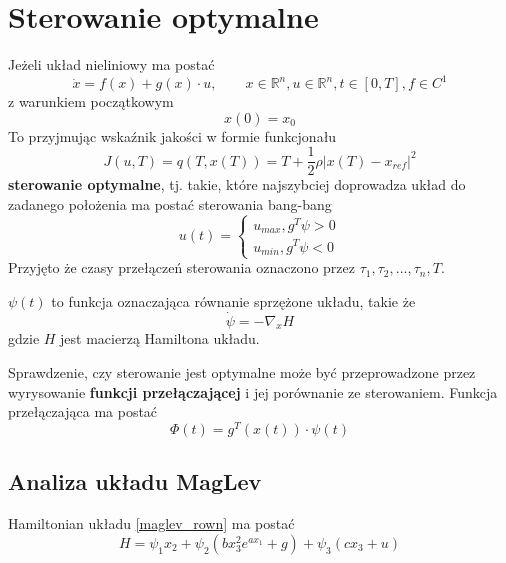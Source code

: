 \section{Sterowanie optymalne}

Jeżeli układ nieliniowy ma postać
\begin{equation}
\dot{x} = f(x) + g(x) \cdot u, \qquad x \in \mathbb{R}^n, u \in \mathbb{R}^n, t \in [0,T], f \in C^1
\end{equation}
z warunkiem początkowym
\begin{equation}
x(0) = x_0
\end{equation}
To przyjmując wskaźnik jakości w formie funkcjonału
\begin{equation} \label{wskaznik}
J(u, T) = q(T, x(T)) = T + \frac{1}{2} \rho |x(T) - x_{ref}|^2
\end{equation}
\textbf{sterowanie optymalne}, tj. takie, które najszybciej doprowadza układ do zadanego położenia ma postać sterowania bang-bang
\begin{equation}
u(t) = 
\begin{cases}
    u_{max}, g^T \psi > 0 \\
    u_{min}, g^T \psi < 0
\end{cases}
\end{equation}
Przyjęto że czasy przełączeń sterowania oznaczono przez $\tau_1, \tau_2, ..., \tau_n, T$.

\noindent
$\psi(t)$ to funkcja oznaczająca równanie sprzężone układu, takie że
\begin{equation}
\dot{\psi} = - \nabla_x H
\end{equation}
gdzie $H$ jest macierzą Hamiltona układu.

Sprawdzenie, czy sterowanie jest optymalne może być przeprowadzone przez wyrysowanie \textbf{funkcji przełączającej} i jej porównanie ze sterowaniem. Funkcja przełączająca ma postać
\begin{equation}
\Phi(t) = g^T(x(t)) \cdot \psi(t)
\end{equation}

\subsection{Analiza układu MagLev}

Hamiltonian układu \ref{maglev_rown} ma postać
\begin{equation}
H = \psi_1 x_2 + \psi_2 (bx_3^2 e^{ax_1}+g) + \psi_3 (cx_3 + u)
\end{equation}

